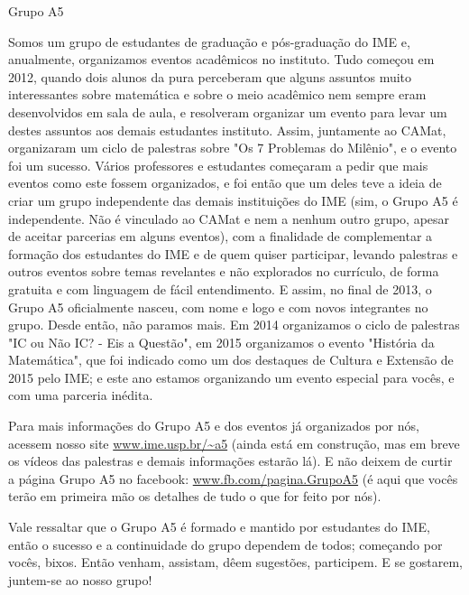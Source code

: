 \begin{subsecao}{Grupo A5}

Somos um grupo de estudantes de graduação e pós-graduação do IME e, anualmente,
organizamos eventos acadêmicos no instituto.  Tudo começou em 2012, quando dois
alunos da pura perceberam que alguns assuntos muito interessantes sobre
matemática e sobre o meio acadêmico nem sempre eram desenvolvidos em sala de
aula, e resolveram organizar um evento para levar um destes assuntos aos demais
estudantes instituto. Assim, juntamente ao CAMat, organizaram um ciclo de
palestras sobre "Os 7 Problemas do Milênio", e o evento foi um sucesso.  Vários
professores e estudantes começaram a pedir que mais eventos como este fossem
organizados, e foi então que um deles teve a ideia de criar um grupo
independente das demais instituições do IME (sim, o Grupo A5 é independente. Não
é vinculado ao CAMat e nem a nenhum outro grupo, apesar de aceitar parcerias em
alguns eventos), com a finalidade de complementar a formação dos estudantes do
IME e de quem quiser participar, levando palestras e outros eventos sobre temas
revelantes e não explorados no currículo, de forma gratuita e com linguagem de
fácil entendimento.  E assim, no final de 2013, o Grupo A5 oficialmente nasceu,
com nome e logo e com novos integrantes no grupo.  Desde então, não paramos
mais. Em 2014 organizamos o ciclo de palestras "IC ou Não IC? - Eis a Questão",
em 2015 organizamos o evento "História da Matemática", que foi indicado como um
dos destaques de Cultura e Extensão de 2015 pelo IME; e este ano estamos
organizando um evento especial para vocês, e com uma parceria inédita.

Para mais informações do Grupo A5 e dos eventos já organizados por nós, acessem
nosso site \url{www.ime.usp.br/~a5} (ainda está em construção, mas em breve os vídeos
das palestras e demais informações estarão lá).  E não deixem de curtir a página
Grupo A5 no facebook: \url{www.fb.com/pagina.GrupoA5} (é aqui que vocês terão em
primeira mão os detalhes de tudo o que for feito por nós).

Vale ressaltar que o Grupo A5 é formado e mantido por estudantes do IME, então o
sucesso e a continuidade do grupo dependem de todos; começando por vocês,
bixos. Então venham, assistam, dêem sugestões, participem. E se gostarem,
juntem-se ao nosso grupo!

\end{subsecao}
